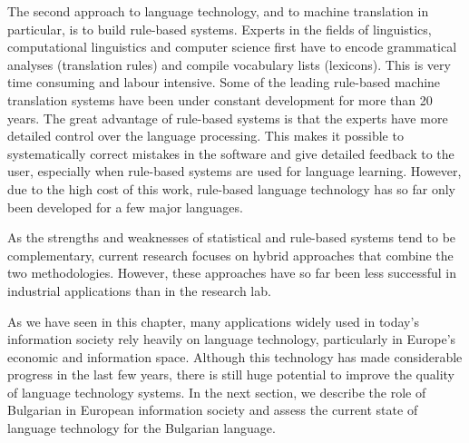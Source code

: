 \begin{multicols}{2}
  The second approach to language technology, and to machine translation in particular, is to build rule-based systems. Experts in the fields of linguistics, computational linguistics and computer science first have to encode grammatical analyses (translation rules) and compile vocabulary lists (lexicons). This is very time consuming and labour intensive. Some of the leading rule-based machine translation systems have been under constant development for more than 20 years. The great advantage of rule-based systems is that the experts have more detailed control over the language processing. This makes it possible to systematically correct mistakes in the software and give detailed feedback to the user, especially when rule-based systems are used for language learning. However, due to the high cost of this work, rule-based language technology has so far only been developed for a few major languages. 


  As the strengths and weaknesses of statistical and rule-based systems tend to be complementary, current research focuses on hybrid approaches that combine the two methodologies. However, these approaches have so far been less successful in industrial applications than in the research lab. 

  As we have seen in this chapter, many applications widely used in today’s information society rely heavily on language technology, particularly in Europe’s economic and information space. Although this technology has made considerable progress in the last few years, there is still huge potential to improve the quality of language technology systems. In the next section, we describe the role of Bulgarian in European information society and assess the current state of language technology for the Bulgarian language.
  \end{multicols}

  \clearpage


